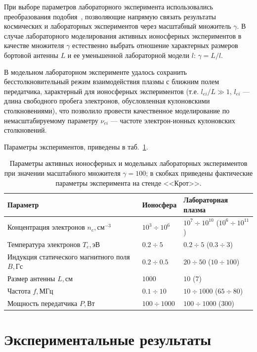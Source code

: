 \documentclass[10pt]{disser}
\begin{document}
При выборе параметров лабораторного эксперимента использовались преобразования подобия~\cite{Alfven}, позволяющие напрямую связать результаты космических и лабораторных экспериментов через масштабный множитель $\gamma$. В случае лабораторного моделирования активных ионосферных экспериментов в качестве множителя $\gamma$ естественно выбрать отношение характерных размеров бортовой антенны $L$ и ее уменьшенной лабораторной модели $l$: $\gamma{}=L/l$. 

В модельном лабораторном эксперименте удалось сохранить бесстолкновительный режим взаимодействия плазмы с ближним полем передатчика, характерный для ионосферных экспериментов (т.е. $l_{ei}/L\gg{}1$, $l_{ei}$ --- длина свободного пробега электронов, обусловленная кулоновскими столкновениями), что позволило провести качественное моделирование по немасштабируемому параметру $\nu_{ei}$ --- частоте электрон-ионных кулоновских столкновений.

Параметры экспериментов, приведены в \mbox{таб.~\ref{tab:value_scaling_ionosphere}}.
\begin{table}[H]
{
   \hfill{}
   \small
   \centering %
   \begin{tabular}{|m{3cm}|m{2.3cm}|m{4.5cm}|}
     \hline
     \textbf{Параметр} & \textbf{Ионосфера} & \textbf{Лабораторная плазма}\\\hline
     Концентрация электронов $n_{e}$,\,см$^{-3}$ & $10^{3}\div{}10^{6}$ & $10^{7}\div{}10^{10}$ ($10^{6}\div{}10^{11}$)\\\hline
     Температура электронов $T_{e}$,\,эВ & $0.2\div5$ & $0.2\div5$ ($0.3\div3$)\\\hline
     Индукция статического магнитного поля $B$,\,Гс & $0.2\div0.5$ & $20\div50$ ($10\div100$)\\\hline
     Размер антенны $L$,\,см & $1000$ & $10$ ($7$)\\\hline
     Частота $f$,\,МГц &$0.1\div10$& $10\div{}1000$ ($65\div 80$)\\\hline
     Мощность передатчика $P$,\,Вт &$100\div1000$& $100\div1000$ ($300$)\\\hline
   \end{tabular}
   \hfill{}
}
\caption{Параметры активных ионосферных и модельных лабораторных экспериментов при значении масштабного множителя $\gamma = 100$; в скобках приведены фактические параметры эксперимента на стенде <<Крот>>.}
   \label{tab:value_scaling_ionosphere}
\end{table}
\section{Экспериментальные результаты}
\end{document}
